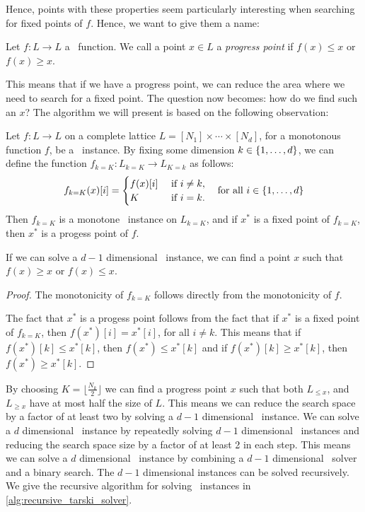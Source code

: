 Hence, points with these properties seem particularly interesting when searching for fixed points of $f$. Hence, we want to give them a name:
\begin{definition}
    Let $f : L \rightarrow L$ a \Tarski\ function. We call a point $x \in L$ a \emph{progress point} if $f(x) \leq x$ or $f(x) \geq x$.
\end{definition}
This means that if we have a progress point, we can reduce the area where we need to search for a fixed point. The question now becomes: how do we find such an $x$? The algorithm we will present is based on the following observation:
\begin{remark}
    Let $f : L \rightarrow L$ on a complete lattice ${L = [N_1] \times \cdots \times [N_d]}$, for a monotonous function $f$, be a \Tarski\ instance. By fixing some dimension ${k \in \left\{1, \dots, d\right\}}$, we can define the function ${f_{k=K} : L_{k=K} \rightarrow L_{K=k}}$ as follows:
    \begin{align*}
        f_{k=K}(x)[i] = \begin{cases}
                            f(x)[i] & \text{ if } i \neq k, \\
                            K       & \text{ if } i = k.
                        \end{cases} \quad \text{for all $i \in \left\{1, \dots, d\right\}$}
    \end{align*}
    Then $f_{k=K}$ is a monotone \Tarski\ instance on $L_{k=K}$, and if $x^*$ is a fixed point of $f_{k=K}$, then $x^*$ is a progess point of $f$.
\end{remark}
If we can solve a $d-1$ dimensional \Tarski\ instance, we can find a point $x$ such that $f(x) \geq x$ or $f(x) \leq x$.
\begin{proof}
    The monotonicity of $f_{k=K}$ follows directly from the monotonicity of $f$. \par
    The fact that $x^*$ is a progess point follows from the fact that if $x^*$ is a fixed point of $f_{k=K}$, then $f(x^*)[i] = x^*[i]$, for all $i \neq k$. This means that if $f(x^*)[k] \leq x^*[k]$, then $f(x^*) \leq x^*[k]$ and if $f(x^*)[k] \geq x^*[k]$, then $f(x^*) \geq x^*[k]$.
\end{proof}
By choosing $K = \lfloor \frac{N_k}{2} \rfloor$ we can find a progress point $x$ such that both $L_{\leq x}$, and $L_{\geq x}$ have at most half the size of $L$. This means we can reduce the search space by a factor of at least two by solving a $d-1$ dimensional \Tarski\ instance. We can solve a $d$ dimensional \Tarski\ instance by repeatedly solving $d-1$ dimensional \Tarski\ instances and reducing the search space size by a factor of at least 2 in each step. This means we can solve a $d$ dimensional \Tarski\ instance by combining a $d-1$ dimensional \Tarski\ solver and a binary search. The $d-1$ dimensional instances can be solved recursively. We give the recursive algorithm for solving \Tarski\ instances in \cref{alg:recursive_tarski_solver}.
